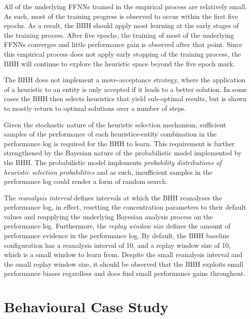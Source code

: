 All of the underlying \acp{FFNN} trained in the empirical process are relatively small. As such, most of the training progress is observed to occur within the first five epochs. As a result, the \acs{BHH} should apply most learning at the early stages of the training process. After five epochs, the training of most of the underlying \acp{FFNN} converges and little performance gain is observed after that point. Since this empirical process does not apply early stopping of the training process, the \acs{BHH} will continue to explore the heuristic space beyond the five epoch mark.

The \acs{BHH} does not implement a move-acceptance strategy, where the application of a heuristic to an entity is only accepted if it leads to a better solution. In some cases the \acs{BHH} then selects heuristics that yield sub-optimal results, but is shown to mostly return to optimal solutions over a number of steps.

Given the stochastic nature of the heuristic selection mechanism, sufficient samples of the performance of each heuristics-entity combination in the performance log is required for the \acs{BHH} to learn. This requirement is further strengthened by the Bayesian nature of the probabilistic model implemented by the \acs{BHH}. The probabilistic model implements \textit{probability distributions of heuristic selection probabilities} and as such, insufficient samples in the performance log could render a form of random search.

The \textit{reanalysis interval} defines intervals at which the \acs{BHH} reanalyses the performance log, in effect, resetting the concentration parameters to their default values and reapplying the underlying Bayesian analysis process on the performance log. Furthermore, the \textit{replay window size} defines the amount of performance evidence in the performance log. By default, the \acs{BHH} baseline configuration has a reanalysis interval of 10, and a replay window size of 10, which is a small window to learn from. Despite the small reanalysis interval and the small replay window size, it should be observed that the \acs{BHH} exploits small performance biases regardless and does find small performance gains throughout.

\section{Behavioural Case Study}\label{sec:results:case_study}


